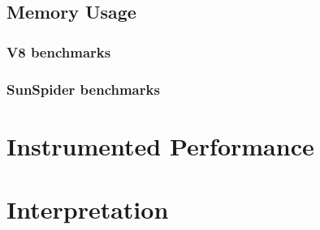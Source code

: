 \subsection{Memory Usage}

\subsubsection{V8 benchmarks}



\subsubsection{SunSpider benchmarks}



\section{Instrumented Performance}

\section{Interpretation}

